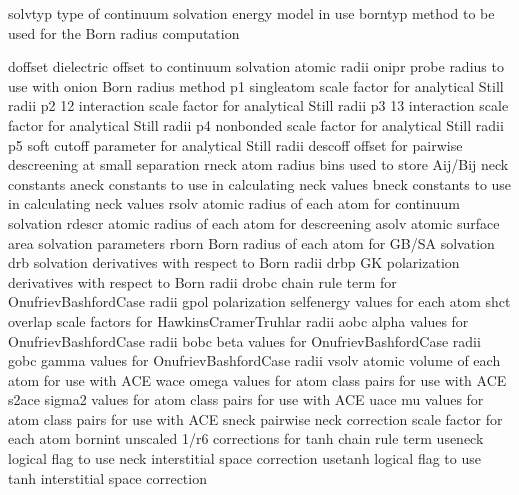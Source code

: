 \documentclass[letterpaper,11pt,english]{sphinxmanual}
\begin{document}
\sphinxAtStartPar
{}

\begin{sphinxVerbatim}[commandchars=\\\{\}]
solvtyp         type of continuum solvation energy model in use
borntyp         method to be used for the Born radius computation
\end{sphinxVerbatim}

\sphinxAtStartPar
{}

\begin{sphinxVerbatim}[commandchars=\\\{\}]
doffset         dielectric offset to continuum solvation atomic radii
onipr           probe radius to use with onion Born radius method
p1              single\PYGZhy{}atom scale factor for analytical Still radii
p2              1\PYGZhy{}2 interaction scale factor for analytical Still radii
p3              1\PYGZhy{}3 interaction scale factor for analytical Still radii
p4              nonbonded scale factor for analytical Still radii
p5              soft cutoff parameter for analytical Still radii
descoff         offset for pairwise descreening at small separation
rneck           atom radius bins used to store Aij/Bij neck constants
aneck           constants to use in calculating neck values
bneck           constants to use in calculating neck values
rsolv           atomic radius of each atom for continuum solvation
rdescr          atomic radius of each atom for descreening
asolv           atomic surface area solvation parameters
rborn           Born radius of each atom for GB/SA solvation
drb             solvation derivatives with respect to Born radii
drbp            GK polarization derivatives with respect to Born radii
drobc           chain rule term for Onufriev\PYGZhy{}Bashford\PYGZhy{}Case radii
gpol            polarization self\PYGZhy{}energy values for each atom
shct            overlap scale factors for Hawkins\PYGZhy{}Cramer\PYGZhy{}Truhlar radii
aobc            alpha values for Onufriev\PYGZhy{}Bashford\PYGZhy{}Case radii
bobc            beta values for Onufriev\PYGZhy{}Bashford\PYGZhy{}Case radii
gobc            gamma values for Onufriev\PYGZhy{}Bashford\PYGZhy{}Case radii
vsolv           atomic volume of each atom for use with ACE
wace            \PYGZdq{}omega\PYGZdq{} values for atom class pairs for use with ACE
s2ace           \PYGZdq{}sigma\PYGZca{}2\PYGZdq{} values for atom class pairs for use with ACE
uace            \PYGZdq{}mu\PYGZdq{} values for atom class pairs for use with ACE
sneck           pairwise neck correction scale factor for each atom
bornint         unscaled 1/r\PYGZca{}6 corrections for tanh chain rule term
useneck         logical flag to use neck interstitial space correction
usetanh         logical flag to use tanh interstitial space correction
\end{sphinxVerbatim}
\end{document}
